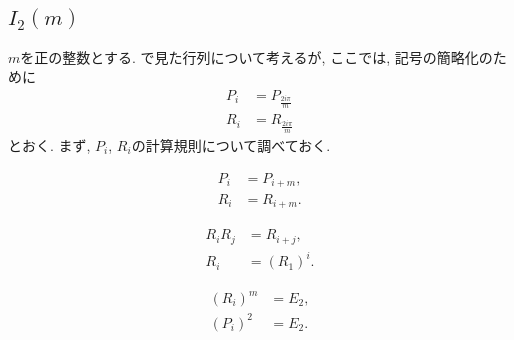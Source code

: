 \subsection{$I_2(m)$}
\label{ex:i2m:grp}
$m$を正の整数とする.
で見た行列について考えるが,
ここでは, 記号の簡略化のために
\begin{align*}
  P_i&=P_{\frac{2i\pi}{m}}\\
  R_i&=R_{\frac{2i\pi}{m}}
\end{align*}
とおく.
まず, $P_i$, $R_i$の計算規則について調べておく.
\begin{lemma}
  \begin{align*}
    P_i &= P_{i+m},\\
    R_i &= R_{i+m}.
  \end{align*}
\end{lemma}
\begin{lemma}
  \begin{align*}
    R_i R_j&= R_{i+j},\\
    R_i&=(R_1)^i.
  \end{align*}
\end{lemma}
\begin{lemma}
  \begin{align*}
    (R_i)^m&=E_2,\\
    (P_i)^2&=E_2.
  \end{align*}
\end{lemma}


